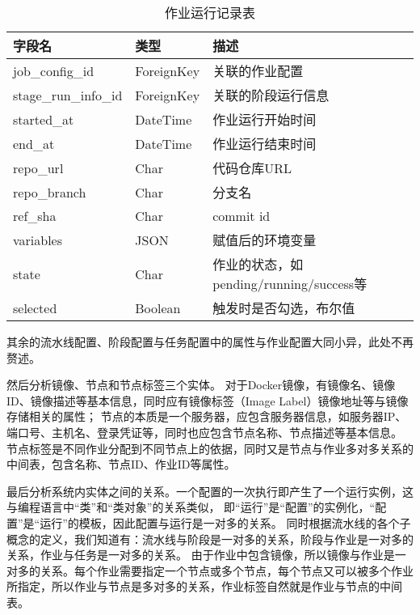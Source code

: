 \begin{table}[h]
  \centering
  \caption{作业运行记录表}
  \label{tab:作业运行记录表}
  \begin{tabular}{lll}
    \toprule
    字段名               & 类型          & 描述                                               \\
    \midrule
    job\_config\_id     & ForeignKey   & 关联的作业配置                                     \\
    stage\_run\_info\_id    & ForeignKey   & 关联的阶段运行信息                                 \\
    started\_at         & DateTime     & 作业运行开始时间                                   \\
    end\_at             & DateTime     & 作业运行结束时间                                   \\
    repo\_url           & Char         & 代码仓库URL                                      \\
    repo\_branch        & Char         & 分支名                                           \\
    ref\_sha            & Char         & commit id                                       \\
    variables           & JSON         & 赋值后的环境变量                                  \\
    state               & Char         & 作业的状态，如pending/running/success等            \\
    selected            & Boolean      & 触发时是否勾选，布尔值                             \\
    \bottomrule
  \end{tabular}
\end{table}

其余的流水线配置、阶段配置与任务配置中的属性与作业配置大同小异，此处不再赘述。

然后分析镜像、节点和节点标签三个实体。
对于Docker镜像，有镜像名、镜像ID、镜像描述等基本信息，同时应有镜像标签（Image Label）镜像地址等与镜像存储相关的属性；
节点的本质是一个服务器，应包含服务器信息，如服务器IP、端口号、主机名、登录凭证等，同时也应包含节点名称、节点描述等基本信息。
节点标签是不同作业分配到不同节点上的依据，同时又是节点与作业多对多关系的中间表，包含名称、节点ID、作业ID等属性。

最后分析系统内实体之间的关系。一个配置的一次执行即产生了一个运行实例，这与编程语言中“类”和“类对象”的关系类似，
即“运行”是“配置”的实例化，“配置”是“运行”的模板，因此配置与运行是一对多的关系。
同时根据流水线的各个子概念的定义，我们知道有：流水线与阶段是一对多的关系，阶段与作业是一对多的关系，作业与任务是一对多的关系。
由于作业中包含镜像，所以镜像与作业是一对多的关系。每个作业需要指定一个节点或多个节点，每个节点又可以被多个作业所指定，所以作业与节点是多对多的关系，作业标签自然就是作业与节点的中间表。


